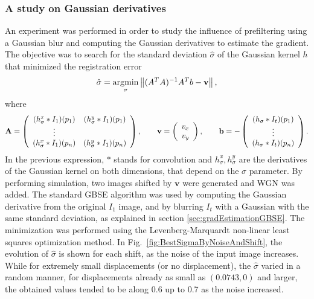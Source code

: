 \subsubsection{A study on Gaussian derivatives}
An experiment was performed in order to study the influence of prefiltering using a Gaussian blur and computing the Gaussian derivatives to estimate the gradient. The objective was to search for the standard deviation $\hat{\sigma}$ of the Gaussian kernel $h$ that minimized the registration error
\begin{equation}
\hat{\sigma} = \operatorname*{\arg\!\min}_{\sigma} \left\lVert(A^T A)^{-1} A^T b -  \mathbf{v}\right\rVert,
\end{equation}
where 
\begin{equation}
\label{eq:opflowEq2}
\bA = \left(
\begin{array}[h!]{cc}
(h^{x}_{\sigma} * I_1)(p_1) & (h^{y}_{\sigma} * I_1)(p_1) \\
\vdots \\
(h^{x}_{\sigma} * I_1)(p_n) & (h^{y}_{\sigma} * I_1)(p_n) 
\end{array}
\right),
\qquad
\bv = \left(
\begin{array}[h!]{c}
v_x \\
v_y
\end{array}
\right),
\qquad
\bb = -\left(
\begin{array}[h!]{c}
(h_{\sigma} * I_t)(p_1) \\
\vdots \\
(h_{\sigma} * I_t)(p_n) 
\end{array}
\right).
\end{equation}
In the previous expression, $*$ stands for convolution and $h^x_{\sigma}, h^y_{\sigma}$ are the derivatives of the Gaussian kernel on both dimensions, that depend on the $\sigma$ parameter. By performing simulation, two images shifted by $\mathbf{v}$ were generated and WGN was added. The standard GBSE algorithm was used by computing the Gaussian derivative from the original $I_1$ image, and by blurring $I_t$ with a Gaussian with the same standard deviation, as explained in section \ref{sec:gradEstimationGBSE}. The minimization was performed using the Levenberg-Marquardt non-linear least squares optimization method. In Fig.~\ref{fig:BestSigmaByNoiseAndShift}, the evolution of $\hat{\sigma}$ is shown for each shift, as the noise of the input image increases. While for extremely small displacements (or no displacement), the $\hat{\sigma}$ varied in a random manner, for displacements already as small as $(0.0743,0)$ and larger, the obtained values tended to be along 0.6 up to 0.7 as the noise increased.

